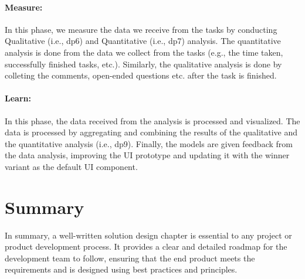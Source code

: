 \paragraph{Measure:}
\label{design:paragraph:measure}
In this phase, we measure the data we receive from the tasks by conducting Qualitative (i.e., \ac{dp}6) and Quantitative (i.e., \ac{dp}7) analysis.
The quantitative analysis is done from the data we collect from the tasks (e.g., the time taken, successfully finished tasks, etc.).
Similarly, the qualitative analysis is done by colleting the comments, open-ended questions etc. after the task is finished. 
\paragraph{Learn:}
\label{design:paragraph:learn}
In this phase, the data received from the analysis is processed and visualized. The data is processed by aggregating and combining the results of the qualitative and the quantitative analysis (i.e., \ac{dp}9). 
Finally, the models are given feedback from the data analysis, improving the UI prototype and updating it with the winner variant as the default UI component.

\section{Summary}
\label{design:section:summary}
In summary, a well-written solution design chapter is essential to any project or product development process. 
It provides a clear and detailed roadmap for the development team to follow, ensuring that the end product meets the requirements and is designed using best practices and principles.